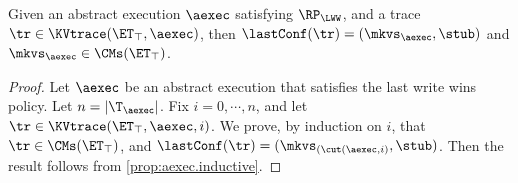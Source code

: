 \begin{proposition}
\label{prop:aexec2kvtrace}
Given an abstract execution $\aexec$ satisfying $\RP_{\LWW}$, 
and a trace $\tr \in \KVtrace(\ET_{\top}, \aexec)$,
then $\lastConf(\tr) = (\mkvs_{\aexec}, \stub)$ and $\mkvs_{\aexec} \in \CMs(\ET_{\top})$. 
\end{proposition}
\begin{proof}
Let $\aexec$ be an abstract execution that satisfies the last write wins policy. 
Let $n = \lvert \T_{\aexec} \rvert$. Fix $i =0,\cdots, n$, 
and let $\tr \in \KVtrace(\ET_{\top}, \aexec, i)$. We prove, by 
induction on $i$, that $\tr \in \CMs(\ET_{\top})$, and 
$\lastConf(\tr) = (\mkvs_{(\cut(\aexec, i)}, \stub)$. 
Then the result follows from  \cref{prop:aexec.inductive}.


\end{proof}
